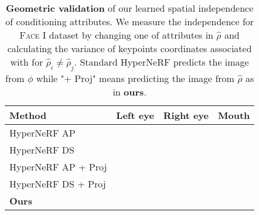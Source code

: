 \begin{table}
  \centering
  \begin{tabular}{@{}lccc@{}}
    \toprule
    Method                                & Left eye & Right eye & Mouth \\
    \midrule
    HyperNeRF AP \cite{park2021hypernerf} &                              \\
    HyperNeRF DS \cite{park2021hypernerf} &                              \\
    HyperNeRF AP + Proj                   &                              \\
    HyperNeRF DS + Proj                   &                              \\
    \midrule
    \textbf{Ours}                         &                              \\
    \bottomrule
  \end{tabular}
  \caption{
    \textbf{Geometric validation} of our learned spatial independence of conditioning attributes.
    We measure the independence for \textsc{Face I} dataset by changing one of
    attributes in $\hat{\rho}$ and calculating the variance of keypoints
    coordinates associated with for $\hat{\rho}_i \neq \hat{\rho}_j$.
    Standard HyperNeRF predicts the image from $\phi$ while "+ Proj" means
    predicting the image from $\hat{\rho}$ as in \textbf{ours}.
  } %
  \label{tab:conerf-geometric-validation}
\end{table}